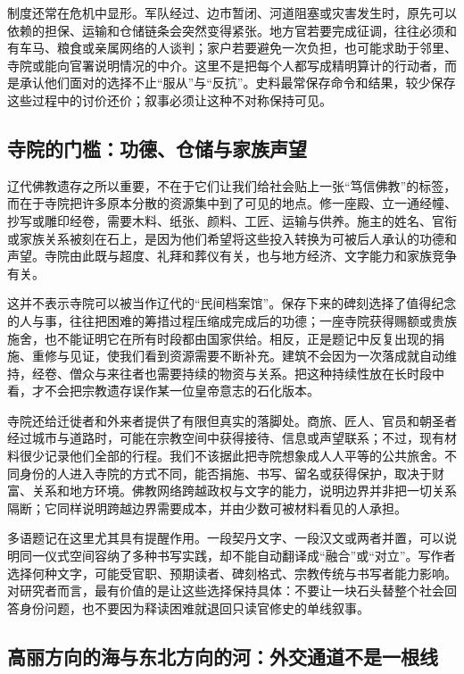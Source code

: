 制度还常在危机中显形。军队经过、边市暂闭、河道阻塞或灾害发生时，原先可以依赖的担保、运输和仓储链条会突然变得紧张。地方官若要完成征调，往往必须和有车马、粮食或亲属网络的人谈判；家户若要避免一次负担，也可能求助于邻里、寺院或能向官署说明情况的中介。这里不是把每个人都写成精明算计的行动者，而是承认他们面对的选择不止“服从”与“反抗”。史料最常保存命令和结果，较少保存这些过程中的讨价还价；叙事必须让这种不对称保持可见。

\subsection{寺院的门槛：功德、仓储与家族声望}

辽代佛教遗存之所以重要，不在于它们让我们给社会贴上一张“笃信佛教”的标签，而在于寺院把许多原本分散的资源集中到了可见的地点。修一座殿、立一通经幢、抄写或雕印经卷，需要木料、纸张、颜料、工匠、运输与供养。施主的姓名、官衔或家族关系被刻在石上，是因为他们希望将这些投入转换为可被后人承认的功德和声望。寺院由此既与超度、礼拜和葬仪有关，也与地方经济、文字能力和家族竞争有关。

这并不表示寺院可以被当作辽代的“民间档案馆”。保存下来的碑刻选择了值得纪念的人与事，往往把困难的筹措过程压缩成完成后的功德；一座寺院获得赐额或贵族施舍，也不能证明它在所有时段都由国家供给。相反，正是题记中反复出现的捐施、重修与见证，使我们看到资源需要不断补充。建筑不会因为一次落成就自动维持，经卷、僧众与来往者也需要持续的物资与关系。把这种持续性放在长时段中看，才不会把宗教遗存误作某一位皇帝意志的石化版本。

寺院还给迁徙者和外来者提供了有限但真实的落脚处。商旅、匠人、官员和朝圣者经过城市与道路时，可能在宗教空间中获得接待、信息或声望联系；不过，现有材料很少记录他们全部的行程。我们不该据此把寺院想象成人人平等的公共旅舍。不同身份的人进入寺院的方式不同，能否捐施、书写、留名或获得保护，取决于财富、关系和地方环境。佛教网络跨越政权与文字的能力，说明边界并非把一切关系隔断；它同样说明跨越边界需要成本，并由少数可被材料看见的人承担。

多语题记在这里尤其具有提醒作用。一段契丹文字、一段汉文或两者并置，可以说明同一仪式空间容纳了多种书写实践，却不能自动翻译成“融合”或“对立”。写作者选择何种文字，可能受官职、预期读者、碑刻格式、宗教传统与书写者能力影响。对研究者而言，最有价值的是让这些选择保持具体：不要让一块石头替整个社会回答身份问题，也不要因为释读困难就退回只读官修史的单线叙事。

\subsection{高丽方向的海与东北方向的河：外交通道不是一根线}

